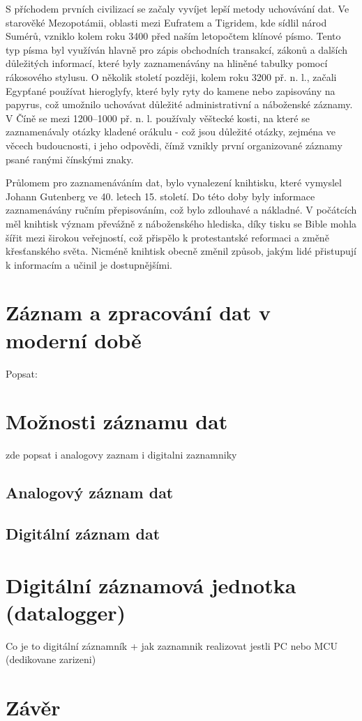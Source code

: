 S příchodem prvních civilizací se začaly vyvíjet lepší metody uchovávání dat. Ve starověké Mezopotámii, oblasti mezi Eufratem a Tigridem, kde sídlil národ 
Sumérů, vzniklo kolem roku 3400 před naším letopočtem klínové písmo. Tento typ písma byl využíván hlavně pro zápis obchodních transakcí, zákonů a dalších 
důležitých informací, které byly zaznamenávány na hliněné tabulky pomocí rákosového stylusu. O několik století později, kolem roku 3200 př. n. l., začali 
Egypťané používat hieroglyfy, které byly ryty do kamene nebo zapisovány na papyrus, což umožnilo uchovávat důležité administrativní a náboženské záznamy. 
V Číně se mezi 1200–1000 př. n. l. používaly věštecké kosti, na které se zaznamenávaly otázky kladené orákulu - což jsou důležité otázky, zejména ve věcech 
budoucnosti, i jeho odpovědi, čímž vznikly první organizované záznamy psané ranými čínskými znaky.

\newpage

Průlomem pro zaznamenáváním dat, bylo vynalezení knihtisku, které vymyslel Johann Gutenberg ve 40. letech 15. století. Do této doby byly informace 
zaznamenávány ručním přepisováním, což bylo zdlouhavé a nákladné. V počátcích měl knihtisk význam převážně z náboženského hlediska, díky tisku se Bible 
mohla šířit mezi širokou veřejností, což přispělo k protestantské reformaci a změně křesťanského světa. Nicméně knihtisk obecně změnil způsob, jakým lidé 
přistupují k informacím a učinil je dostupnějšími. \cite{knihtisk_medium}

\section{Záznam a zpracování dat v moderní době}
Popsat: 

\section{Možnosti záznamu dat}
\label{moznosti_zaznamu_dat}

zde popsat i analogovy zaznam i digitalni zaznamniky
\subsection{Analogový záznam dat}
\label{moznosti_zaznamu_dat}

\subsection{Digitální záznam dat}
\label{moznosti_zaznamu_dat}


\section{Digitální záznamová jednotka (datalogger)}
\label{digitalni_zaznamnik}
Co je to digitální záznamník
+ jak zaznamnik realizovat jestli PC nebo MCU (dedikovane zarizeni)

\section{Závěr}
\label{zaverPrace}